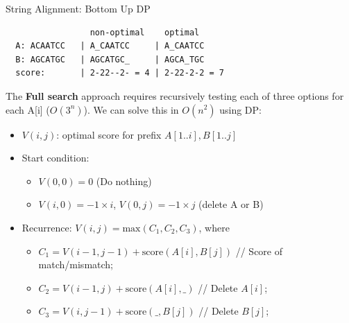 \begin{frame}[fragile]{String Alignment: Bottom Up DP}
  \begin{verbatim}
                 non-optimal    optimal
  A: ACAATCC   | A_CAATCC     | A_CAATCC
  B: AGCATGC   | AGCATGC_     | AGCA_TGC
  score:       | 2-22--2- = 4 | 2-22-2-2 = 7
  \end{verbatim}
  The {\bf Full search} approach requires recursively testing each of three options for each A[i] ($O(3^n)$). We can solve this in $O(n^2)$ using DP:

  \begin{itemize}
    \item $V(i,j)$: optimal score for prefix $A[1..i],B[1..j]$
    \item Start condition:
    \begin{itemize}
      \item $V(0,0) = 0$ \hspace{1cm} (Do nothing)
      \item $V(i,0) = -1\times i$, $V(0,j) = -1\times j$ \hspace{1cm} (delete A or B)
    \end{itemize}
    \item Recurrence: $V(i,j) = \text{max}(C_1, C_2, C_3)$, where
    \begin{itemize}
      \item $C_1 = V(i-1, j-1) + \text{score}(A[i],B[j])$ // Score of match/mismatch;
      \item $C_2 = V(i-1,j) + \text{score}(A[i],\_)$ \hspace{1cm}// Delete $A[i]$;
      \item $C_3 = V(i,j-1) + \text{score}(\_,B[j])$ \hspace{1cm}// Delete $B[j]$;
    \end{itemize}
  \end{itemize}
\end{frame}


